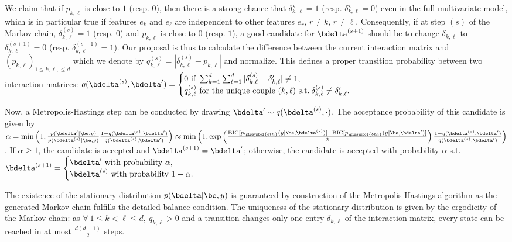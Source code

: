 {{{We claim that if $p_{k,\ell}$ is close to $1$ (resp. $0$), then there is a strong chance that $\delta_{k,\ell}^\star = 1$ (resp. $\delta_{k,\ell}^\star = 0$) even in the full multivariate model, which is in particular true if features $e_k$ and $e_{\ell}$ are independent to other features $e_r$, $r \neq k$, $r \neq \ell$. Consequently, if at step $(s)$ of the Markov chain, $\delta_{k,\ell}^{(s)} = 1$ (resp. $0$) and $p_{k,\ell}$ is close to $0$ (resp. $1$), a good candidate for $\bdelta^{(s+1)}$ should be to change $\delta_{k,\ell}$ to $\delta_{k,\ell}^{(s+1)} = 0$ (resp. $\delta_{k,\ell}^{(s+1)} = 1$). Our proposal is thus to calculate the difference between the current interaction matrix and $(p_{k,\ell})_{1 \leq k,\ell, \leq d}$ which we denote by $q_{k,\ell}^{(s)} = |\delta_{k,\ell}^{(s)} - p_{k,\ell}|$ and normalize. This defines a proper transition probability between two interaction matrices: $q(\bdelta^{(s)},\bdelta') = \begin{cases} 0 \text{ if } \sum_{k=1}^d \sum_{\ell=1}^d |\delta^{(s)}_{k,\ell} - \delta_{k,\ell}'| \neq 1, \\ q_{k,\ell}^{(s)} \text{ for the unique couple } (k,\ell) \text{ s.t.} \: \delta^{(s)}_{k,\ell} \neq \delta_{k,\ell}'. \end{cases}$

Now, a Metropolis-Hastings step can be conducted by drawing $\bdelta' \sim q(\bdelta^{(s)},\cdot)$. The acceptance probability of this candidate is given by $\alpha = \min \left( 1, \frac{p(\bdelta' | \be,y)}{p(\bdelta^{(s)} | \be, y)} \frac{1-q(\bdelta^{(s)},\bdelta')}{q(\bdelta^{(s)},\bdelta')} \right) \approx \min \left( 1, \exp \left( \frac{\text{BIC}[p_{\glssymbol{bth}}(y | \be, \bdelta^{(s)})] - \text{BIC}[p_{\glssymbol{bth}}(y | \be, \bdelta')]}{2} \right) \frac{1-q(\bdelta^{(s)},\bdelta')}{q(\bdelta^{(s)},\bdelta')} \right)$. If $\alpha \geq 1$, the candidate is accepted and $\bdelta^{(s+1)} = \bdelta'$; otherwise, the candidate is accepted with probability $\alpha$ s.t.\ $\bdelta^{(s+1)} = \begin{cases} \bdelta' \text{ with probability } \alpha, \\ \bdelta^{(s)} \text{ with probability } 1-\alpha. \end{cases}$

The existence of the stationary distribution $p(\bdelta | \be,y)$ is guaranteed by construction of the Metropolis-Hastings algorithm as the generated Markov chain fulfills the detailed balance condition. The uniqueness of the stationary distribution is given by the ergodicity of the Markov chain: as $\forall \: 1 \leq  k < \ell \leq d, \: q_{k,\ell} > 0$ and a transition changes only one entry $\delta_{k,\ell}$ of the interaction matrix, every state can be reached in at most $\frac{d(d-1)}{2}$ steps.

}}}
